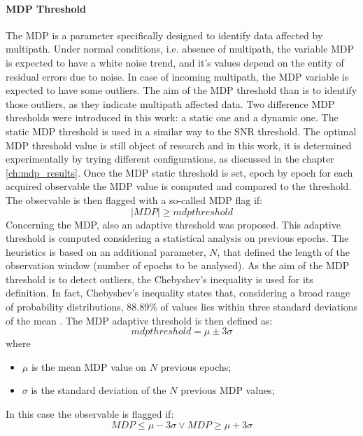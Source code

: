 \paragraph*{MDP Threshold}
The MDP is a parameter specifically designed to identify data affected by multipath. Under normal conditions, i.e. absence of multipath, the variable MDP is expected to have a white noise trend, and it's values depend on the entity of residual errors due to noise. In case of incoming multipath, the MDP variable is expected to have some outliers. The aim of the MDP threshold than is to identify those outliers, as they indicate multipath affected data. Two difference MDP thresholds were introduced in this work: a static one and a dynamic one. The static MDP threshold is used in a similar way to the SNR threshold. The optimal MDP threshold value is still object of research and in this work, it is determined experimentally by trying different configurations, as discussed in the chapter \ref{ch:mdp_results}.  Once the MDP static threshold is set, epoch by epoch for each acquired observable the MDP value is computed and compared to the threshold. The observable is then flagged with a so-called MDP flag if:
\begin{equation}
|MDP| \geq mdpthreshold 
\label{eq:mdpthres}
\end{equation}
Concerning the MDP, also an adaptive threshold was proposed. This adaptive threshold is computed considering a statistical analysis on previous epochs. 
The heuristics is based on an additional parameter, $N$, that defined the length of the observation window (number of epochs to be analysed). As the aim of the MDP threshold is to detect outliers, the Chebyshev's inequality is used for its definition. In fact, Chebyshev’s inequality states that, considering a broad range of probability distributions, 88.89\% of values lies within three standard deviations of the mean \cite{chebyshev:1}. The MDP adaptive threshold is then defined as:
\begin{equation}
mdpthreshold = \mu \pm 3\sigma
\label{eq:mdpthres_din}
\end{equation}
where
\begin{itemize}
    \item $\mu$ is the mean MDP value on $N$ previous epochs;
    \item $\sigma$ is the standard deviation of the $N$ previous MDP values;
\end{itemize}
In this case the observable is flagged if:
\begin{equation}
MDP \leq \mu -3\sigma \vee MDP \geq \mu + 3\sigma
\label{eq:mdpthres_dyn}
\end{equation}
